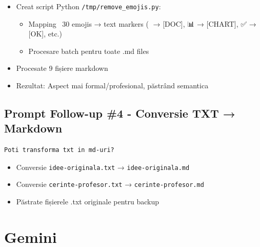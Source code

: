 \documentclass[11pt,a4paper]{article}
\begin{document}
\begin{tcolorbox}[colback=outputbackground,colframe=green!75!black,title=Output Generat]
\begin{itemize}[leftmargin=*]
    \item Creat script Python \texttt{/tmp/remove\_emojis.py}:
    \begin{itemize}
        \item Mapping ~30 emojis → text markers (📖 → [DOC], 📊 → [CHART], ✅ → [OK], etc.)
        \item Procesare batch pentru toate .md files
    \end{itemize}
    \item Procesate 9 fișiere markdown
    \item Rezultat: Aspect mai formal/profesional, păstrând semantica
\end{itemize}
\end{tcolorbox}

\subsection{Prompt Follow-up \#4 - Conversie TXT → Markdown}

\begin{tcolorbox}[colback=promptbackground,colframe=blue!75!black,title=Prompt Input]
\begin{verbatim}
Poti transforma txt in md-uri?
\end{verbatim}
\end{tcolorbox}

\begin{tcolorbox}[colback=outputbackground,colframe=green!75!black,title=Output Generat]
\begin{itemize}[leftmargin=*]
    \item Conversie \texttt{idee-originala.txt} → \texttt{idee-originala.md}
    \item Conversie \texttt{cerinte-profesor.txt} → \texttt{cerinte-profesor.md}
    \item Păstrate fișierele .txt originale pentru backup
\end{itemize}
\end{tcolorbox}

\newpage
\section{Gemini}
\end{document}
